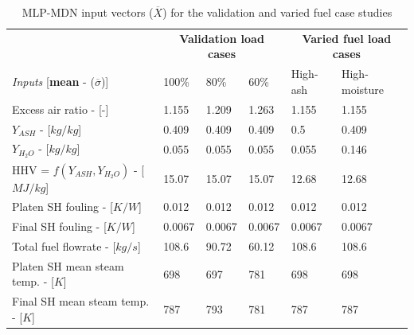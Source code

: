 \documentclass[a4paper,fleqn]{cas-dc}
\begin{document}
\begin{table}[h!]
\caption{MLP-MDN input vectors ($\overline{X}$) for the validation and varied fuel case studies}\label{tbl_inputs}
\begin{tabular*}{\tblwidth}{lp{}p{}p{}p{}p{}}
\toprule
 & \multicolumn{3}{c}{\textbf{Validation load cases}}&\multicolumn{2}{c}{\textbf{Varied fuel load cases}}\\
\textit{Inputs} [\textbf{mean} - ($\overline{\sigma}$)]& 100\%  & 80\% & 60\% & High-ash & High-moisture  \\
\midrule
Excess air ratio - [-] & 1.155 & 1.209 & 1.263 & 1.155 & 1.155  \\
$Y_{ASH}$ - [$kg/kg$] & 0.409 & 0.409 &  0.409 &0.5 & 0.409 \\
$Y_{H_{2}O}$ - [$kg/kg$] & 0.055 & 0.055 & 0.055 & 0.055 & 0.146  \\
HHV = $f(Y_{ASH},Y_{H_{2}O})$ - [$MJ/kg$] & 15.07 & 15.07 & 15.07 & 12.68 & 12.68  \\
Platen SH fouling - [$K/W$]& 0.012 & 0.012 & 0.012 & 0.012 & 0.012  \\
Final SH fouling - [$K/W$] & 0.0067&0.0067 &0.0067 & 0.0067&0.0067  \\
Total fuel flowrate - [$kg/s$] &108.6 & 90.72 & 60.12 &108.6 & 108.6 \\
Platen SH mean steam temp. - [$K$] & 698 &697&781 &698 &698  \\
Final SH mean steam temp. - [$K$]& 787 & 793 &781 &787 &787  \\
\bottomrule
\end{tabular*}
\end{table}  
\end{document}
